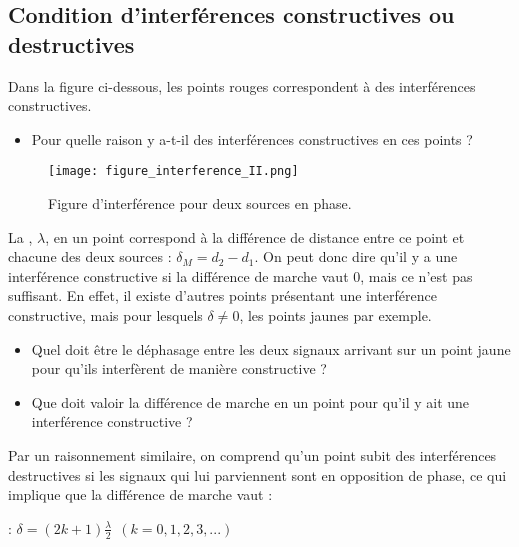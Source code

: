 \newpage

\subsection{Condition d'interférences constructives ou destructives}
Dans la figure ci-dessous, les points rouges correspondent à des interférences constructives.
\begin{itemize}[label=\textbullet]
    \item Pour quelle raison y a-t-il des interférences constructives en ces points ?
\end{itemize}

\begin{figure}[ht]
    \centering
    \texttt{[image: figure\_interference\_II.png]}
    \caption{Figure d'interférence pour deux sources en phase.}
\end{figure}

La , \(\lambda\), en un point correspond à la différence de distance entre ce point et chacune des deux sources : \(\delta _M=d_2 - d_1\). On peut donc dire qu'il y a une interférence constructive si la différence de marche vaut 0, mais ce n'est pas suffisant. En effet, il existe d'autres points présentant une interférence constructive, mais pour lesquels \(\delta \neq 0\), les points jaunes par exemple.

\newpage

\begin{itemize}[label=\textbullet]
    \item Quel doit être le déphasage entre les deux signaux arrivant sur un point jaune pour qu'ils interfèrent de manière constructive ?
    \item Que doit valoir la différence de marche en un point pour qu'il y ait une interférence constructive ?
\end{itemize}



Par un raisonnement similaire, on comprend qu'un point subit des interférences destructives si les signaux qui lui parviennent sont en opposition de phase, ce qui implique que la différence de marche vaut :

\begin{encadre}
     : \(\delta = (2k+1) \frac{\lambda}{2} \ \ (k=0,1,2,3,...)\)
\end{encadre}

